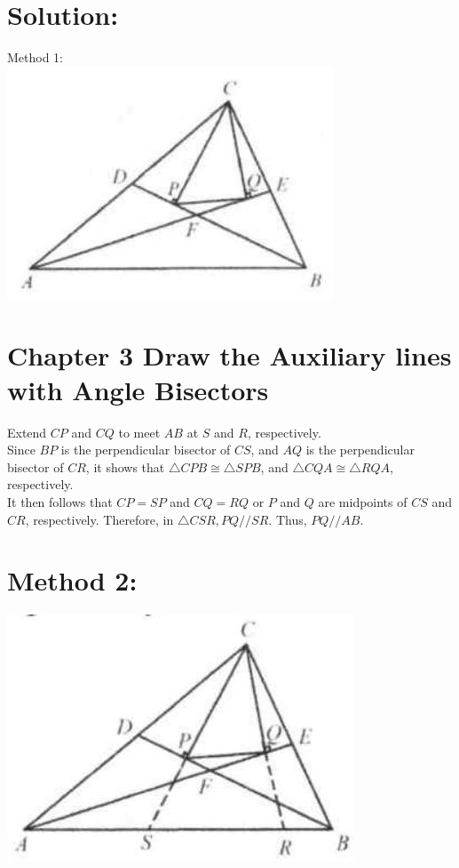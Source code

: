 \documentclass[10pt]{article}
\begin{document}
\section*{Solution:}
Method 1:\\
\includegraphics[max width=\textwidth, center]{2025_04_17_97bc1f7e44d93c271a88g-058(2)}

\section*{Chapter 3 Draw the Auxiliary lines with Angle Bisectors}
Extend \(C P\) and \(C Q\) to meet \(A B\) at \(S\) and \(R\), respectively.\\
Since \(B P\) is the perpendicular bisector of \(C S\), and \(A Q\) is the perpendicular bisector of \(C R\), it shows that \(\triangle C P B \cong \triangle S P B\), and \(\triangle C Q A \cong \triangle R Q A\), respectively.\\
It then follows that \(C P=S P\) and \(C Q=R Q\) or \(P\) and \(Q\) are midpoints of \(C S\) and \(C R\), respectively. Therefore, in \(\triangle C S R, P Q / / S R\). Thus, \(P Q / / A B\).

\section*{Method 2:}
\begin{center}
\includegraphics[max width=\textwidth]{2025_04_17_97bc1f7e44d93c271a88g-059(3)}
\end{center}
\end{document}
